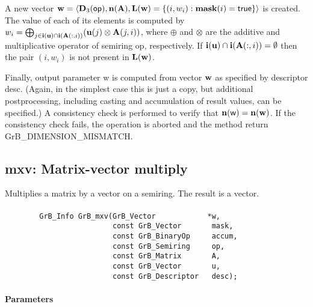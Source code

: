 A new vector ${\bf w} = \langle \bold{D}_3({\sf op}),
\bold{n}({\bf A}), \bold{L}({\bf w}) = \{(i,w_i) : {\bf mask}(i)
= {\sf true} \} \rangle$ is created.  The value of each of its elements
is computed by $w_i = \bigoplus_{j \in {\bf i}({\bf u}) \cap
{\bf i}({\bf A}(:,i))} ({\bf u}(j) \otimes {\bf A}(j,i))$,
where $\oplus$ and $\otimes$ are the additive and multiplicative
operator of semiring {\sf op}, respectively.  If ${\bf i}({\bf u})
\cap {\bf i}({\bf A}(:,i)) = \emptyset$ then the pair $(i,w_i)$
is not present in $\bold{L}({\bf w})$.

Finally, output parameter {\sf w} is computed from vector ${\bf w}$
as specified by descriptor {\sf desc}. (Again, in the simplest case this
is just a copy, but additional postprocessing, including casting and
accumulation of result values, can be specified.)  A consistency check is
performed to verify that $\bold{n}({\sf w}) = \bold{n}({\bf w})$. If
the consistency check fails, the operation is aborted and the method
return {\sf GrB\_DIMENSION\_MISMATCH}.



\subsection{{\sf mxv}: Matrix-vector multiply}

Multiplies a matrix by a vector on a semiring. The result is a vector.

\paragraph{\syntax}

\begin{verbatim}
        GrB_Info GrB_mxv(GrB_Vector            *w,
                         const GrB_Vector       mask,
                         const GrB_BinaryOp     accum,
                         const GrB_Semiring     op, 
                         const GrB_Matrix       A,
                         const GrB_Vector       u,
                         const GrB_Descriptor   desc);
\end{verbatim}

\paragraph{Parameters}

